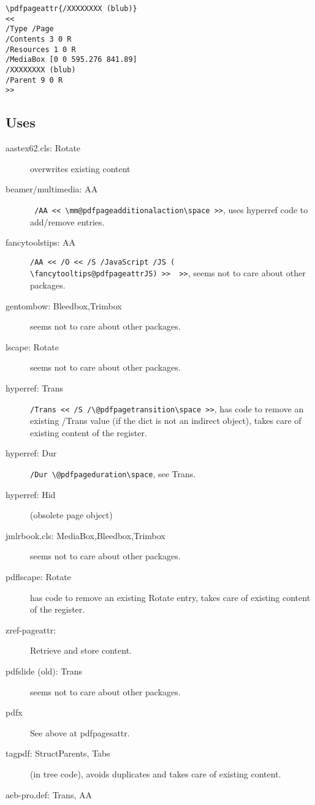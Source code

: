 \documentclass{article}
\begin{document}
\begin{verbatim}
\pdfpageattr{/XXXXXXXX (blub)}
<<
/Type /Page
/Contents 3 0 R
/Resources 1 0 R
/MediaBox [0 0 595.276 841.89]
/XXXXXXXX (blub)
/Parent 9 0 R
>>
\end{verbatim}

\subsection{Uses}
\begin{description}
  \item[aastex62.cls: Rotate] overwrites existing content
  \item[beamer/multimedia: AA] \verb+ /AA << \mm@pdfpageadditionalaction\space >>+, uses hyperref code to add/remove entries.
  \item[fancytoolstips: AA] \verb+/AA << /O << /S /JavaScript /JS (    \fancytooltips@pdfpageattrJS) >>  >>+, seems not to care about other packages.

  \item[gentombow: Bleedbox,Trimbox] seems not to care about other packages.
  \item[lscape: Rotate] seems not to care about other packages.
  \item[hyperref: Trans] \verb+/Trans << /S /\@pdfpagetransition\space >>+, has code to remove an existing /Trans value (if the dict is not an indirect object), takes care of existing content of the register.

  \item[hyperref: Dur] \verb+/Dur \@pdfpageduration\space+, see Trans.
  \item[hyperref: Hid] (obsolete page object)
  \item[jmlrbook.cls: MediaBox,Bleedbox,Trimbox] seems not to care about other packages.
  \item[pdflscape: Rotate] has code to remove an existing Rotate entry, takes care of existing content of the register.
  \item[zref-pageattr:] Retrieve and store content.
  \item[pdfslide (old): Trans]  seems not to care about other packages.
  \item[pdfx] See above at pdfpagesattr.
  \item[tagpdf: StructParents, Tabs] (in tree code), avoids duplicates and takes care of existing content.
  \item[aeb-pro.def: Trans, AA]
\end{description}
\end{document}
